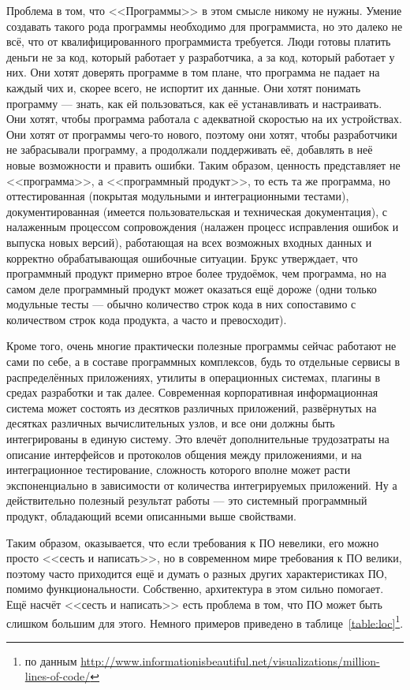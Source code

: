 \documentclass{../../text-style}
\begin{document}
Проблема в том, что <<Программы>> в этом смысле никому не нужны. Умение создавать такого рода программы необходимо для программиста, но это далеко не всё, что от квалифицированного программиста требуется. Люди готовы платить деньги не за код, который работает у разработчика, а за код, который работает у них. Они хотят доверять программе в том плане, что программа не падает на каждый чих и, скорее всего, не испортит их данные. Они хотят понимать программу --- знать, как ей пользоваться, как её устанавливать и настраивать. Они хотят, чтобы программа работала с адекватной скоростью на их устройствах. Они хотят от программы чего-то нового, поэтому они хотят, чтобы разработчики не забрасывали программу, а продолжали поддерживать её, добавлять в неё новые возможности и править ошибки. Таким образом, ценность представляет не <<программа>>, а <<программный продукт>>, то есть та же программа, но оттестированная (покрытая модульными и интеграционными тестами), документированная (имеется пользовательская и техническая документация), с налаженным процессом сопровождения (налажен процесс исправления ошибок и выпуска новых версий), работающая на всех возможных входных данных и корректно обрабатывающая ошибочные ситуации. Брукс утверждает, что программный продукт примерно втрое более трудоёмок, чем программа, но на самом деле программный продукт может оказаться ещё дороже (одни только модульные тесты --- обычно количество строк кода в них сопоставимо с количеством строк кода продукта, а часто и превосходит).

Кроме того, очень многие практически полезные программы сейчас работают не сами по себе, а в составе программных комплексов, будь то отдельные сервисы в распределённых приложениях, утилиты в операционных системах, плагины в средах разработки и так далее. Современная корпоративная информационная система может состоять из десятков различных приложений, развёрнутых на десятках различных вычислительных узлов, и все они должны быть интегрированы в единую систему. Это влечёт дополнительные трудозатраты на описание интерфейсов и протоколов общения между приложениями, и на интеграционное тестирование, сложность которого вполне может расти экспоненциально в зависимости от количества интегрируемых приложений. Ну а действительно полезный результат работы --- это системный программный продукт, обладающий всеми описанными выше свойствами.

Таким образом, оказывается, что если требования к ПО невелики, его можно просто <<сесть и написать>>, но в современном мире требования к ПО велики, поэтому часто приходится ещё и думать о разных других характеристиках ПО, помимо функциональности. Собственно, архитектура в этом сильно помогает. Ещё насчёт <<сесть и написать>> есть проблема в том, что ПО может быть слишком большим для этого. Немного примеров приведено в таблице~\ref{table:loc}\footnote{по данным \url{http://www.informationisbeautiful.net/visualizations/million-lines-of-code/}}.
\end{document}

